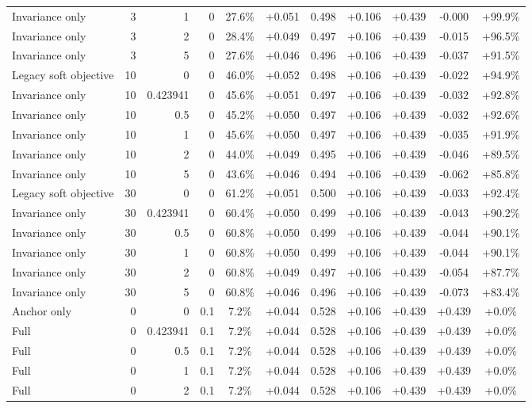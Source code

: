 \begin{table}[htbp]
\begin{tabular}{lrrrccccccc}
Invariance only & 3 & 1 & 0 & 27.6\% & +0.051 & 0.498 & +0.106 & +0.439 & -0.000 & +99.9\% \\
Invariance only & 3 & 2 & 0 & 28.4\% & +0.049 & 0.497 & +0.106 & +0.439 & -0.015 & +96.5\% \\
Invariance only & 3 & 5 & 0 & 27.6\% & +0.046 & 0.496 & +0.106 & +0.439 & -0.037 & +91.5\% \\
Legacy soft objective & 10 & 0 & 0 & 46.0\% & +0.052 & 0.498 & +0.106 & +0.439 & -0.022 & +94.9\% \\
Invariance only & 10 & 0.423941 & 0 & 45.6\% & +0.051 & 0.497 & +0.106 & +0.439 & -0.032 & +92.8\% \\
Invariance only & 10 & 0.5 & 0 & 45.2\% & +0.050 & 0.497 & +0.106 & +0.439 & -0.032 & +92.6\% \\
Invariance only & 10 & 1 & 0 & 45.6\% & +0.050 & 0.497 & +0.106 & +0.439 & -0.035 & +91.9\% \\
Invariance only & 10 & 2 & 0 & 44.0\% & +0.049 & 0.495 & +0.106 & +0.439 & -0.046 & +89.5\% \\
Invariance only & 10 & 5 & 0 & 43.6\% & +0.046 & 0.494 & +0.106 & +0.439 & -0.062 & +85.8\% \\
Legacy soft objective & 30 & 0 & 0 & 61.2\% & +0.051 & 0.500 & +0.106 & +0.439 & -0.033 & +92.4\% \\
Invariance only & 30 & 0.423941 & 0 & 60.4\% & +0.050 & 0.499 & +0.106 & +0.439 & -0.043 & +90.2\% \\
Invariance only & 30 & 0.5 & 0 & 60.8\% & +0.050 & 0.499 & +0.106 & +0.439 & -0.044 & +90.1\% \\
Invariance only & 30 & 1 & 0 & 60.8\% & +0.050 & 0.499 & +0.106 & +0.439 & -0.044 & +90.1\% \\
Invariance only & 30 & 2 & 0 & 60.8\% & +0.049 & 0.497 & +0.106 & +0.439 & -0.054 & +87.7\% \\
Invariance only & 30 & 5 & 0 & 60.8\% & +0.046 & 0.496 & +0.106 & +0.439 & -0.073 & +83.4\% \\
Anchor only & 0 & 0 & 0.1 & 7.2\% & +0.044 & 0.528 & +0.106 & +0.439 & +0.439 & +0.0\% \\
Full & 0 & 0.423941 & 0.1 & 7.2\% & +0.044 & 0.528 & +0.106 & +0.439 & +0.439 & +0.0\% \\
Full & 0 & 0.5 & 0.1 & 7.2\% & +0.044 & 0.528 & +0.106 & +0.439 & +0.439 & +0.0\% \\
Full & 0 & 1 & 0.1 & 7.2\% & +0.044 & 0.528 & +0.106 & +0.439 & +0.439 & +0.0\% \\
Full & 0 & 2 & 0.1 & 7.2\% & +0.044 & 0.528 & +0.106 & +0.439 & +0.439 & +0.0\% \\

\end{tabular}
\end{table}
